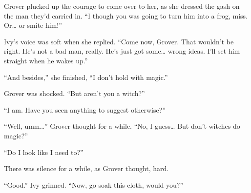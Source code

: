 \storybreak

Grover plucked up the courage to come over to her, as she dressed the gash on the man they'd carried in.
``I though you was going to turn him into a frog, miss.
Or{\dots} or smite him!''

Ivy's voice was soft when she replied.
``Come now, Grover.
That wouldn't be right.
He's not a bad man, really.
He's just got some{\dots} wrong ideas.
I'll set him straight when he wakes up.''

``And besides,'' she finished, ``I don't hold with magic.''

Grover was shocked.
``But aren't you a witch?''

``I am.
Have you seen anything to suggest otherwise?''

``Well, umm{\dots}''
Grover thought for a while.
``No, I guess{\dots}
But don't witches do magic?''

``Do I look like I need to?''

There was silence for a while, as Grover thought, hard.

``Good.''
Ivy grinned.
``Now, go soak this cloth, would you?''
